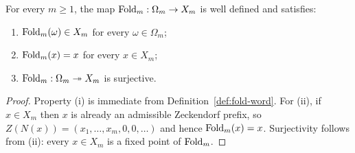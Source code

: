 \begin{proposition}
\label{prop:fold-basic}
For every $m\ge 1$, the map $\operatorname{Fold}_m:\Omega_m\to X_m$ is well defined and
satisfies:
\begin{enumerate}[label=\textup{(\roman*)}]
\item $\operatorname{Fold}_m(\omega)\in X_m$ for every $\omega\in\Omega_m$;
\item $\operatorname{Fold}_m(x)=x$ for every $x\in X_m$;
\item $\operatorname{Fold}_m:\Omega_m\twoheadrightarrow X_m$ is surjective.
\end{enumerate}
\end{proposition}

\begin{proof}
Property (i) is immediate from Definition~\ref{def:fold-word}.  For (ii), if
$x\in X_m$ then $x$ is already an admissible Zeckendorf prefix, so
$Z(N(x))=(x_1,\ldots,x_m,0,0,\ldots)$ and hence $\operatorname{Fold}_m(x)=x$.  Surjectivity
follows from (ii): every $x\in X_m$ is a fixed point of $\operatorname{Fold}_m$.
\end{proof}
